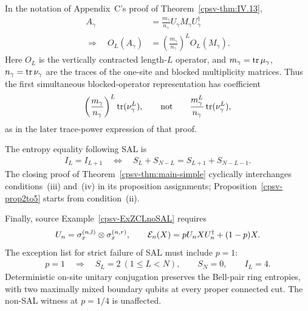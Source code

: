 \documentclass[aps,pra,reprint,nofootinbib,onecolumn]{revtex4-2}
\begin{document}
In the notation of Appendix~C's proof of
Theorem~\ref{cpsv-thm:IV.13},
\begin{align}
	A_\gamma      & =\frac{m_\gamma}{n_\gamma}
	U_\gamma M_\gamma U_\gamma^\dagger\nonumber \\
	\Longrightarrow\quad
	O_L(A_\gamma) & =
	\left(\frac{m_\gamma}{n_\gamma}\right)^LO_L(M_\gamma).
	\label{eq:corrected-OL-scaling}
\end{align}
Here $O_L$ is the vertically contracted length-$L$ operator,
and $m_\gamma=\operatorname{tr}\mu_\gamma$, $n_\gamma=\operatorname{tr}\nu_\gamma$ are
the traces of the one-site and blocked multiplicity matrices.
Thus the first simultaneous blocked-operator representation has
coefficient
\begin{align}
	\left(\frac{m_\gamma}{n_\gamma}\right)^L\operatorname{tr}(\nu_\gamma^L),
	\qquad\text{not}\qquad
	\frac{m_\gamma^L}{n_\gamma}\operatorname{tr}(\nu_\gamma^L),
	\label{eq:corrected-coefficient}
\end{align}
as in the later trace-power expression of that proof.

The entropy equality following SAL is
\begin{align}
	I_L=I_{L+1}
	\quad\Longleftrightarrow\quad
	S_L+S_{N-L}=S_{L+1}+S_{N-L-1}.
	\label{eq:corrected-sal-entropy}
\end{align}
The closing proof of Theorem~\ref{cpsv-thm:main-simple}
cyclically interchanges conditions~(iii) and~(iv) in its
proposition assignments; Proposition~\ref{cpsv-prop2to5}
starts from condition~(ii).

Finally, source Example~\ref{cpsv-ExZCLnoSAL} requires
\begin{align}
	U_n=\sigma_x^{(n,l)}\otimes\sigma_x^{(n,r)},\qquad
	\mathcal{E}_n(X)=pU_nXU_n^\dagger+(1-p)X.
	\label{eq:corrected-En-qubits}
\end{align}
The exception list for strict failure of SAL must include $p=1$:
\begin{align}
	p=1\quad\Longrightarrow\quad
	S_L=2\ (1\leq L<N),\qquad
	S_N=0,\qquad I_L=4.
	\label{eq:p1-exception}
\end{align}
Deterministic on-site unitary conjugation preserves the
Bell-pair ring entropies, with two maximally mixed boundary qubits
at every proper connected cut. The non-SAL witness at $p=1/4$
is unaffected.

\renewcommand{\bibsection}{\par\medskip}


\end{document}
